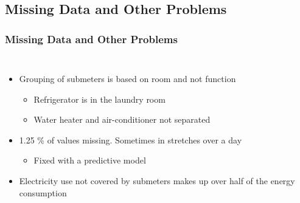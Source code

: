 \documentclass[10pt]{beamer}
\begin{document}
\subsection{Missing Data and Other Problems}
\begin{frame}
\frametitle{Missing Data and Other Problems}

\begin{columns}[c] %


\begin{itemize}
    \item Grouping of submeters is based on room and not function
    \begin{itemize}
        \item Refrigerator is in the laundry room
        \item Water heater and air-conditioner not separated
    \end{itemize}
    \item 1.25 \% of values missing. Sometimes in stretches over a day
    \begin{itemize}
        \item Fixed with a predictive model
    \end{itemize}
    \item Electricity use not covered by submeters makes up over half of the energy consumption
\end{itemize}



\end{columns}
\end{frame}
\end{document}
